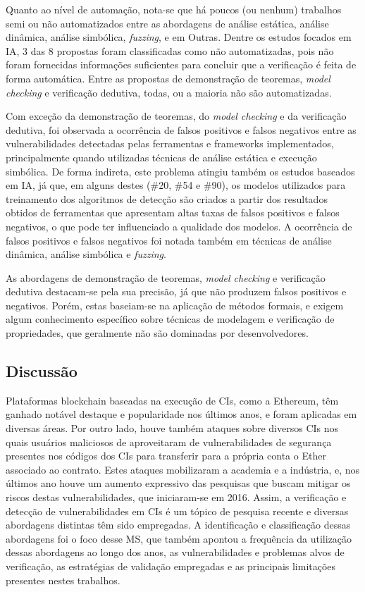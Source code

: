 Quanto ao nível de automação, nota-se que há poucos (ou nenhum) trabalhos semi ou não automatizados entre as abordagens de análise estática, análise dinâmica, análise simbólica, \textit{fuzzing}, e em Outras. Dentre os estudos focados em IA, 3 das 8 propostas foram classificadas como não automatizadas, pois não foram fornecidas informações suficientes para concluir que a verificação é feita de forma automática. Entre as propostas de demonstração de teoremas, \textit{model checking} e verificação dedutiva, todas, ou a maioria não são automatizadas.

Com exceção da demonstração de teoremas, do \textit{model checking} e da verificação dedutiva, foi observada a ocorrência de falsos positivos e falsos negativos entre as vulnerabilidades detectadas pelas ferramentas e frameworks implementados, principalmente quando utilizadas técnicas de análise estática e execução simbólica. De forma indireta, este problema atingiu também os estudos baseados em IA, já que, em alguns destes (\#20, \#54 e \#90), os modelos utilizados para treinamento dos algoritmos de detecção são criados a partir dos resultados obtidos de ferramentas que apresentam altas taxas de falsos positivos e falsos negativos, o que pode ter influenciado a qualidade dos modelos. A ocorrência de falsos positivos e falsos negativos foi notada também em técnicas de análise dinâmica, análise simbólica e \textit{fuzzing}.

As abordagens de demonstração de teoremas, \textit{model checking} e verificação dedutiva destacam-se pela sua precisão, já que não produzem falsos positivos e negativos. Porém, estas baseiam-se na aplicação de métodos formais, e exigem algum conhecimento específico sobre técnicas de modelagem e verificação de propriedades, que geralmente não são dominadas por desenvolvedores.  

\subsection{Discussão} \label{tex:rev:ms:discussao}

Plataformas blockchain baseadas na execução de CIs, como a Ethereum, têm ganhado notável destaque e popularidade nos últimos anos, e foram aplicadas em diversas áreas. Por outro lado, houve também ataques sobre diversos CIs nos quais usuários maliciosos de aproveitaram de vulnerabilidades de segurança presentes nos códigos dos CIs para transferir para a própria conta o Ether associado ao contrato. Estes ataques mobilizaram a academia e a indústria, e, nos últimos ano houve um aumento expressivo das pesquisas que buscam mitigar os riscos destas vulnerabilidades, que iniciaram-se em 2016. Assim, a verificação e detecção de vulnerabilidades em CIs é um tópico de pesquisa recente e diversas abordagens distintas têm sido empregadas. A identificação e classificação dessas abordagens foi o foco desse MS, que também apontou a frequência da utilização dessas abordagens ao longo dos anos, as vulnerabilidades e problemas alvos de verificação, as estratégias de validação empregadas e as principais limitações presentes nestes trabalhos.

